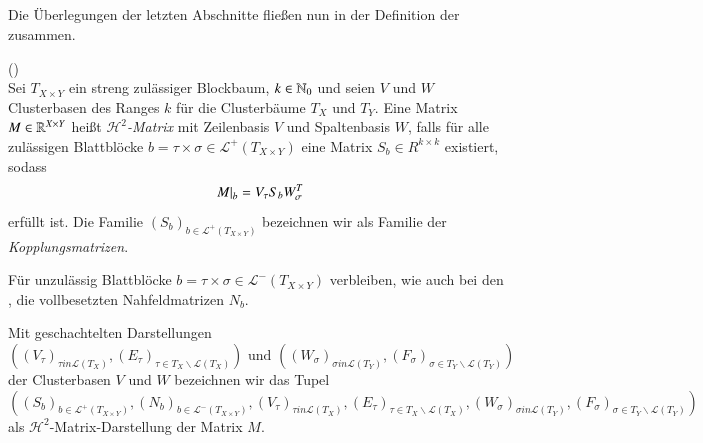     \subsection{\hquad}
    \label{sek:hquad}
      Die Überlegungen der letzten Abschnitte fließen nun in der Definition der \hquad zusammen.
      
      \begin{defn}
	(\hquad)\\
	Sei $T_{X \times Y}$ ein streng zulässiger Blockbaum, $k \in \mathbb{N}_0$ und seien $V$ und $W$ Clusterbasen des Ranges $k$ für die Clusterbäume $T_X$ und $T_Y$. Eine Matrix 
	$M \in \mathbb{R}^{X \times Y}$ heißt \textit{$\mathcal{H}^2$-Matrix} mit Zeilenbasis $V$ und Spaltenbasis $W$, falls für alle zulässigen Blattblöcke 
	$b = \tau \times \sigma \in \mathcal{L}^+\left(T_{X \times Y}\right)$ eine Matrix $S_b \in R^{k \times k}$ existiert, sodass
	\begin{equation*}
	  \left. M \right|_b = V_\tau S_b W_\sigma^T
	\end{equation*}
	erfüllt ist. Die Familie $\left(S_b\right)_{b \in \mathcal{L}^+\left(T_{X \times Y}\right)}$ bezeichnen wir als Familie der \textit{Kopplungsmatrizen}.
      \end{defn}
      
      Für unzulässig Blattblöcke $b = \tau \times \sigma \in \mathcal{L}^-\left(T_{X \times Y}\right)$ verbleiben, wie auch bei den \hmat, die vollbesetzten Nahfeldmatrizen $N_b$.
      
      Mit geschachtelten Darstellungen 
      \[
      \left( 
	\left(V_\tau \right)_{\tau in \mathcal{L}\left(T_X\right)} , \left(E_\tau\right)_{\tau \in T_X \backslash \mathcal{L}\left(T_X\right)} \right) \text{ und }
	\left( \left(W_\sigma\right)_{\sigma in \mathcal{L}\left(T_Y\right)} , \left(F_\sigma\right)_{\sigma \in T_Y \backslash \mathcal{L}\left(T_Y\right)}
      \right) 
      \]
      der Clusterbasen $V$ und $W$ bezeichnen wir das Tupel
      \[
       \left(
	\left(S_b\right)_{b \in \mathcal{L}^+\left(T_{X \times Y}\right)} , \left(N_b\right)_{b \in \mathcal{L}^-\left(T_{X \times Y}\right)},
	\left(V_\tau\right)_{\tau in \mathcal{L}\left(T_X\right)} , \left(E_\tau\right)_{\tau \in T_X \backslash \mathcal{L}\left(T_X\right)},
	\left(W_\sigma\right)_{\sigma in \mathcal{L}\left(T_Y\right)} , \left(F_\sigma\right)_{\sigma \in T_Y \backslash \mathcal{L}\left(T_Y\right)}
       \right)
      \]
      als $\mathcal{H}^2$-Matrix-Darstellung der Matrix $M$.

